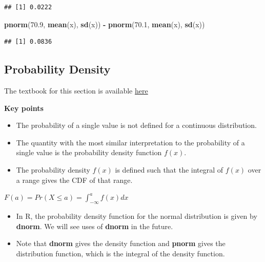 \documentclass[
]{article}
\newenvironment{Shaded}{\begin{snugshade}}{\end{snugshade}}
\newcommand{\FloatTok}[1]{\textcolor[rgb]{0.00,0.00,0.81}{#1}}
\newcommand{\KeywordTok}[1]{\textcolor[rgb]{0.13,0.29,0.53}{\textbf{#1}}}
\newcommand{\NormalTok}[1]{#1}
\newcommand{\OperatorTok}[1]{\textcolor[rgb]{0.81,0.36,0.00}{\textbf{#1}}}
\newcommand{\StringTok}[1]{\textcolor[rgb]{0.31,0.60,0.02}{#1}}
\providecommand{\tightlist}{%
  \setlength{\itemsep}{0pt}\setlength{\parskip}{0pt}}
\begin{document}
\begin{verbatim}
## [1] 0.0222
\end{verbatim}

\begin{Shaded}
\begin{Highlighting}[]
\KeywordTok{pnorm}\NormalTok{(}\FloatTok{70.9}\NormalTok{, }\KeywordTok{mean}\NormalTok{(x), }\KeywordTok{sd}\NormalTok{(x)) }\OperatorTok{{-}}\StringTok{ }\KeywordTok{pnorm}\NormalTok{(}\FloatTok{70.1}\NormalTok{, }\KeywordTok{mean}\NormalTok{(x), }\KeywordTok{sd}\NormalTok{(x))}
\end{Highlighting}
\end{Shaded}

\begin{verbatim}
## [1] 0.0836
\end{verbatim}

\hypertarget{probability-density}{%
\subsection{Probability Density}\label{probability-density}}

The textbook for this section is available
\href{https://rafalab.github.io/dsbook/probability.html\#the-probability-density}{here}

\textbf{Key points}

\begin{itemize}
\tightlist
\item
  The probability of a single value is not defined for a continuous
  distribution.
\item
  The quantity with the most similar interpretation to the probability
  of a single value is the probability density function \(f(x)\).
\item
  The probability density \(f(x)\) is defined such that the integral of
  \(f(x)\) over a range gives the CDF of that range.
\end{itemize}

\(F(a) = Pr(X \le a) = \int_{-\infty}^{a} f(x)dx\)

\begin{itemize}
\tightlist
\item
  In R, the probability density function for the normal distribution is
  given by \textbf{dnorm}. We will see uses of \textbf{dnorm} in the
  future.
\item
  Note that \textbf{dnorm} gives the density function and \textbf{pnorm}
  gives the distribution function, which is the integral of the density
  function.
\end{itemize}
\end{document}
